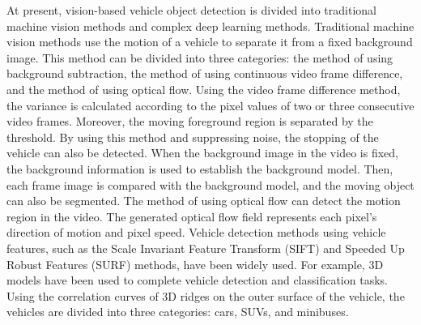 \begin{sloppypar}
At present, vision-based vehicle object detection is divided into traditional machine vision methods and complex deep learning methods. Traditional machine vision methods use the motion of a vehicle to separate it from a fixed background image. This method can be divided into three categories: the method of using background subtraction, the method of using continuous video frame difference, and the method of using optical flow. Using the video frame difference method, the variance is calculated according to the pixel values of two or three consecutive video frames. Moreover, the moving foreground region is separated by the threshold. By using this method and suppressing noise, the stopping of the vehicle can also be detected. When the background image in the video is fixed, the background information is used to establish the background model. Then, each frame image is compared with the background model, and the moving object can also be segmented. The method of using optical flow can detect the motion region in the video. The generated optical flow field represents each pixel’s direction of motion and pixel speed. Vehicle detection methods using vehicle features, such as the Scale Invariant Feature Transform (SIFT) and Speeded Up Robust Features (SURF) methods, have been widely used. For example, 3D models have been used to complete vehicle detection and classification tasks. Using the correlation curves of 3D ridges on the outer surface of the vehicle, the vehicles are divided into three categories: cars, SUVs, and minibuses.

\end{sloppypar}

